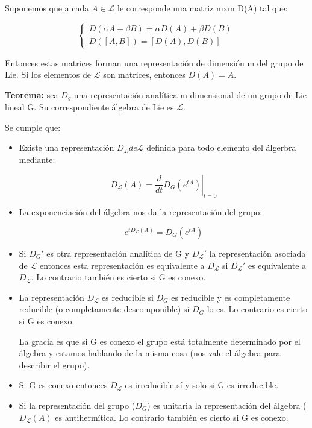 \documentclass{article}
\begin{document}
Suponemos que a cada $A \in \mathcal{L}$ le corresponde una matriz mxm D(A) tal que:

$$\left \lbrace \begin{array}{c}
  D(\alpha A+\beta B)=\alpha D(A) + \beta D(B)  \\
  D([A,B])=[D(A),D(B)]
\end{array} \right .$$

Entonces estas matrices forman una representación de dimensión m del grupo de Lie. Si los elementos de $\mathcal{L}$ son matrices, entonces $D(A)=A$.

\smallskip
\textbf{Teorema:} sea $D_g$ una representación analítica m-dimensional de un grupo de Lie lineal G. Su correspondiente álgebra de Lie es $\mathcal{L}$.

Se cumple que:

\begin{itemize}
 \item Existe una representación $D_\mathcal{L} de \mathcal{L}$ definida para todo elemento del álgerbra mediante:

 $$D_\mathcal{L}(A)=\left .\frac{d}{dt}D_G(e^{tA})\right |_{t=0}$$

 \item La exponenciación del álgebra nos da la representación del grupo:

 $$e^{tD_\mathcal{L}(A)}=D_G(e^{tA})$$

 \item Si $D_G'$ es otra representación analítica de G y $D_\mathcal{L}'$ la representación asociada de $\mathcal{L}$ entonces esta representación es equivalente a $D_\mathcal{L}$ si $D_\mathcal{L}'$ es equivalente a $D_\mathcal{L}$. Lo contrario también es cierto si G es conexo.

 \item La representación $D_\mathcal{L}$ es reducible si $D_G$ es reducible y es completamente reducible (o completamente descomponible) si $D_G$ lo es. Lo contrario es cierto si G es conexo.

 La gracia es que si G es conexo el grupo está totalmente determinado por el álgebra y estamos hablando de la misma cosa (nos vale el álgebra para describir el grupo).

 \item Si G es conexo entonces $D_\mathcal{L}$ es irreducible sí y solo si G es irreducible.

 \item Si la representación del grupo ($D_G$) es unitaria la representación del álgebra ($D_\mathcal{L}(A)$ es antihermítica. Lo contrario también es cierto si G es conexo.
\end{itemize}
\end{document}
